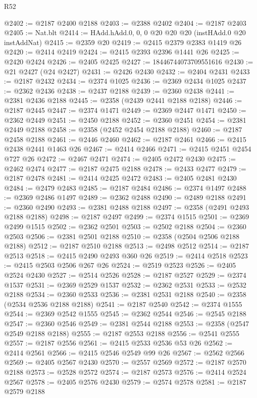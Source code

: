 \begin{lexlean}{R52}
\begin{coremodule}
@2402 := @2187 @2400 @2188
@2403 := @2388 @2402
@2404 := @2187 @2403
@2405 := Nat.blt
@2414 := HAdd.hAdd.{0, 0, 0} @20 @20 @20 (instHAdd.{0} @20 instAddNat)
@2415 := @2359 @20
@2419 := @2415 @2379 @2383 @1419 @26
@2420 := @2414 @2419
@2424 := @2415 @2393 @2396 @1441 @26
@2425 := @2420 @2424
@2426 := @2405 @2425
@2427 := 18446744073709551616
@2430 := @21 @2427 (@24 @2427)
@2431 := @2426 @2430
@2432 := @2404 @2431
@2433 := @2187 @2432
@2434 := @2374 @1025
@2436 := @2369 @2434 @1025
@2437 := @2362 @2436
@2438 := @2437 @2188
@2439 := @2360 @2438
@2441 := @2381 @2436 @2188
@2445 := @2358 (@2439 @2441 @2188 @2188)
@2446 := @2187 @2445
@2447 := @2374 @1471
@2449 := @2369 @2447 @1471
@2450 := @2362 @2449
@2451 := @2450 @2188
@2452 := @2360 @2451
@2454 := @2381 @2449 @2188
@2458 := @2358 (@2452 @2454 @2188 @2188)
@2460 := @2187 @2458 @2188
@2461 := @2446 @2460
@2462 := @2187 @2461
@2466 := @2415 @2438 @2441 @1463 @26
@2467 := @2414 @2466
@2471 := @2415 @2451 @2454 @727 @26
@2472 := @2467 @2471
@2474 := @2405 @2472 @2430
@2475 := @2462 @2474
@2477 := @2187 @2475 @2188
@2478 := @2433 @2477
@2479 := @2187 @2478
@2481 := @2414 @2425 @2472
@2483 := @2405 @2481 @2430
@2484 := @2479 @2483
@2485 := @2187 @2484
@2486 := @2374 @1497
@2488 := @2369 @2486 @1497
@2489 := @2362 @2488
@2490 := @2489 @2188
@2491 := @2360 @2490
@2493 := @2381 @2488 @2188
@2497 := @2358 (@2491 @2493 @2188 @2188)
@2498 := @2187 @2497
@2499 := @2374 @1515
@2501 := @2369 @2499 @1515
@2502 := @2362 @2501
@2503 := @2502 @2188
@2504 := @2360 @2503
@2506 := @2381 @2501 @2188
@2510 := @2358 (@2504 @2506 @2188 @2188)
@2512 := @2187 @2510 @2188
@2513 := @2498 @2512
@2514 := @2187 @2513
@2518 := @2415 @2490 @2493 @360 @26
@2519 := @2414 @2518
@2523 := @2415 @2503 @2506 @267 @26
@2524 := @2519 @2523
@2526 := @2405 @2524 @2430
@2527 := @2514 @2526
@2528 := @2187 @2527
@2529 := @2374 @1537
@2531 := @2369 @2529 @1537
@2532 := @2362 @2531
@2533 := @2532 @2188
@2534 := @2360 @2533
@2536 := @2381 @2531 @2188
@2540 := @2358 (@2534 @2536 @2188 @2188)
@2541 := @2187 @2540
@2542 := @2374 @1555
@2544 := @2369 @2542 @1555
@2545 := @2362 @2544
@2546 := @2545 @2188
@2547 := @2360 @2546
@2549 := @2381 @2544 @2188
@2553 := @2358 (@2547 @2549 @2188 @2188)
@2555 := @2187 @2553 @2188
@2556 := @2541 @2555
@2557 := @2187 @2556
@2561 := @2415 @2533 @2536 @53 @26
@2562 := @2414 @2561
@2566 := @2415 @2546 @2549 @99 @26
@2567 := @2562 @2566
@2569 := @2405 @2567 @2430
@2570 := @2557 @2569
@2572 := @2187 @2570 @2188
@2573 := @2528 @2572
@2574 := @2187 @2573
@2576 := @2414 @2524 @2567
@2578 := @2405 @2576 @2430
@2579 := @2574 @2578
@2581 := @2187 @2579 @2188

\end{coremodule}
\end{lexlean}
